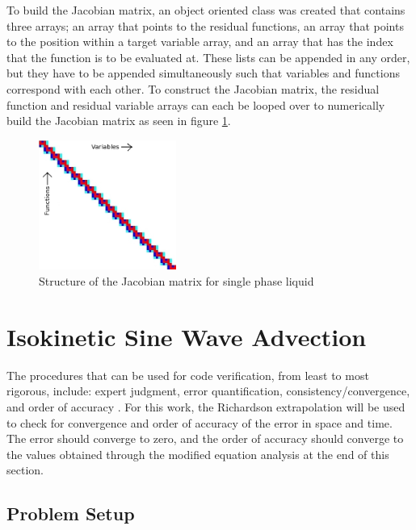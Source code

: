 \documentclass{mc2015}
\begin{document}
	To build the Jacobian matrix, an object oriented class was created that
    contains three arrays; an array that points to the residual functions, an
    array that points to the position within a target variable array, and an
    array that has the index that the function is to be evaluated at. These
    lists can be appended in any order, but they have to be appended
    simultaneously such that variables and functions correspond with each
    other. To construct the Jacobian matrix, the residual function and
    residual variable arrays can each be looped over to numerically build the
    Jacobian matrix as seen in figure \ref{fig:Jacobian_Setup}. 
    
    \begin{figure}[!h]
    	\centering
    	\includegraphics[width=0.40\textwidth]{images/Jacobian_Setup}
    	\caption{Structure of the Jacobian matrix for single phase liquid}
    	\label{fig:Jacobian_Setup}
    \end{figure}

\section{Isokinetic Sine Wave Advection}

The procedures that can be used for code verification, from least to most
rigorous, include: expert judgment, error quantification,
consistency/convergence, and order of accuracy \cite{Oberkampf2008}. For this
work, the Richardson extrapolation will be used to check for convergence and
order of accuracy of the error in space and time. The error should converge to
zero, and the order of accuracy should converge to the values obtained through
the modified equation analysis \cite{Villatoro1999} at the end of this section.
 
\subsection{Problem Setup}
\end{document}
